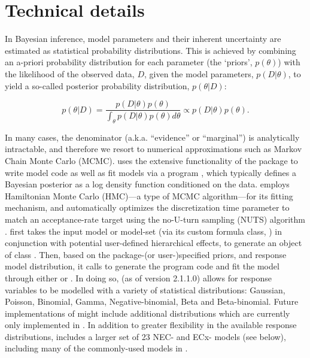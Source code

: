 \documentclass[
  shortnames]{jss}
\begin{document}
\hypertarget{technical-details}{%
\section{Technical details}\label{technical-details}}

In Bayesian inference, model parameters and their inherent uncertainty are estimated as statistical probability distributions. This is achieved by combining an a-priori probability distribution for each parameter (the `priors', \(p(\theta)\)) with the likelihood of the observed data, \(D\), given the model parameters, \(p(D | \theta)\), to yield a so-called posterior probability distribution, \(p(\theta | D)\):

\begin{equation}
  p(\theta | D) = \frac{p(D | \theta) p(\theta)}{\int_{\theta} p(D | \theta) p(\theta) d \theta} \propto p(D | \theta) p(\theta).
  \label{eqn1}
\end{equation}

In many cases, the denominator (a.k.a. ``evidence'' or ``marginal'') is analytically intractable, and therefore we resort to numerical approximations such as Markov Chain Monte Carlo (MCMC).  uses the extensive functionality of the  package to write model code as well as fit models via a  program \citep{stan2021}, which typically defines a Bayesian posterior as a log density function conditioned on the data.  employs Hamiltonian Monte Carlo (HMC)---a type of MCMC algorithm---for its fitting mechanism, and automatically optimizes the discretization time parameter to match an acceptance-rate target using the no-U-turn sampling (NUTS) algorithm \citep{hoffman2014}.  first takes the input model or model-set (via its custom formula class, ) in conjunction with potential user-defined hierarchical effects, to generate an object of class . Then, based on the package-(or user-)specified priors, and response model distribution, it calls  \citep{Burkner2017, Burkner2018} to generate the  program code and fit the model through either  \citep{rstan2021} or \citep{cmdstanr2022}. In doing so,  (as of version 2.1.1.0) allows for response variables to be modelled with a variety of statistical distributions: Gaussian, Poisson, Binomial, Gamma, Negative-binomial, Beta and Beta-binomial. Future implementations of  might include additional distributions which are currently only implemented in . In addition to greater flexibility in the available response distributions,  includes a larger set of 23 NEC- and ECx- models (see below), including many of the commonly-used models in  \citep{Ritz2016}.
\end{document}
